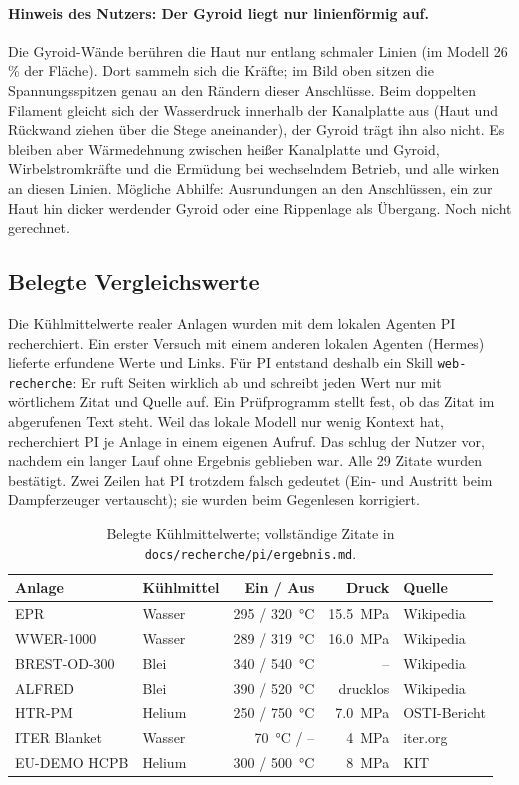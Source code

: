 \documentclass[10pt,a4paper]{article}
\begin{document}
\paragraph{Hinweis des Nutzers: Der Gyroid liegt nur linienförmig auf.} Die Gyroid-Wände berühren die Haut nur
entlang schmaler Linien (im Modell 26\,\% der Fläche). Dort sammeln sich die Kräfte; im Bild oben sitzen die
Spannungsspitzen genau an den Rändern dieser Anschlüsse. Beim doppelten Filament gleicht sich der Wasserdruck
innerhalb der Kanalplatte aus (Haut und Rückwand ziehen über die Stege aneinander), der Gyroid trägt ihn also
nicht. Es bleiben aber Wärmedehnung zwischen heißer Kanalplatte und Gyroid, Wirbelstromkräfte und die
Ermüdung bei wechselndem Betrieb, und alle wirken an diesen Linien. Mögliche Abhilfe: Ausrundungen an den
Anschlüssen, ein zur Haut hin dicker werdender Gyroid oder eine Rippenlage als Übergang. Noch nicht gerechnet.

\subsection{Belegte Vergleichswerte}
Die Kühlmittelwerte realer Anlagen wurden mit dem lokalen Agenten PI recherchiert. Ein erster Versuch mit einem
anderen lokalen Agenten (Hermes) lieferte erfundene Werte und Links. Für PI entstand deshalb ein Skill
\texttt{web-recherche}: Er ruft Seiten wirklich ab und schreibt jeden Wert nur mit wörtlichem Zitat und Quelle auf.
Ein Prüfprogramm stellt fest, ob das Zitat im abgerufenen Text steht. Weil das lokale Modell nur wenig Kontext
hat, recherchiert PI je Anlage in einem eigenen Aufruf. Das schlug der Nutzer vor, nachdem ein langer Lauf ohne
Ergebnis geblieben war. Alle 29 Zitate wurden bestätigt. Zwei Zeilen hat PI trotzdem falsch gedeutet (Ein- und
Austritt beim Dampferzeuger vertauscht); sie wurden beim Gegenlesen korrigiert.
\begin{table}[H]\centering\small
\begin{tabular}{llrrl}\toprule
Anlage & Kühlmittel & Ein / Aus & Druck & Quelle\\\midrule
EPR & Wasser & \SI{295}{} / \SI{320}{\celsius} & \SI{15,5}{MPa} & Wikipedia\\
WWER-1000 & Wasser & \SI{289}{} / \SI{319}{\celsius} & \SI{16,0}{MPa} & Wikipedia\\
BREST-OD-300 & Blei & \SI{340}{} / \SI{540}{\celsius} & -- & Wikipedia\\
ALFRED & Blei & \SI{390}{} / \SI{520}{\celsius} & drucklos & Wikipedia\\
HTR-PM & Helium & \SI{250}{} / \SI{750}{\celsius} & \SI{7,0}{MPa} & OSTI-Bericht\\
ITER Blanket & Wasser & \SI{70}{\celsius} / -- & \SI{4}{MPa} & iter.org\\
EU-DEMO HCPB & Helium & \SI{300}{} / \SI{500}{\celsius} & \SI{8}{MPa} & KIT\\\bottomrule
\end{tabular}\caption{Belegte Kühlmittelwerte; vollständige Zitate in \texttt{docs/recherche/pi/ergebnis.md}.}\end{table}
\end{document}
